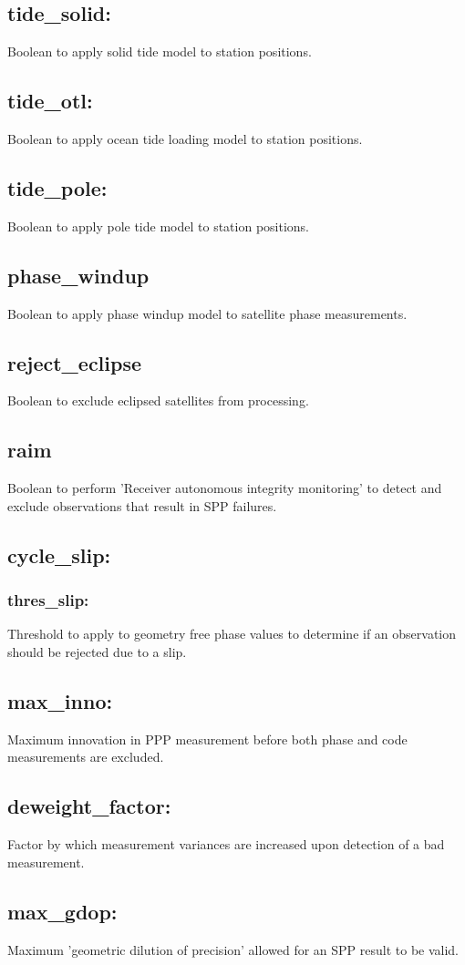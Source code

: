 \subsection*{tide\_solid:}
Boolean to apply solid tide model to station positions.
\subsection*{tide\_otl:}
Boolean to apply ocean tide loading model to station positions.
\subsection*{tide\_pole:}
Boolean to apply pole tide model to station positions.
\subsection*{phase\_windup}
Boolean to apply phase windup model to satellite phase measurements.
\subsection*{reject\_eclipse}
Boolean to exclude eclipsed satellites from processing.
\subsection*{raim}
Boolean to perform 'Receiver autonomous integrity monitoring' to detect and exclude observations that result in SPP failures.
\subsection*{cycle\_slip:}
\subsubsection*{thres\_slip:}
Threshold to apply to geometry free phase values to determine if an observation should be rejected due to a slip.
\subsection*{max\_inno:}
Maximum innovation in PPP measurement before both phase and code measurements are excluded.
\subsection*{deweight\_factor:}
Factor by which measurement variances are increased upon detection of a bad measurement.
\subsection*{max\_gdop:}
Maximum 'geometric dilution of precision' allowed for an SPP result to be valid.
